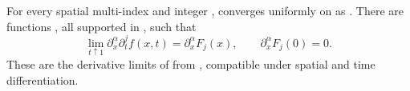 \begin{lemma}\label{lem:10.2}
For every spatial multi-index  and integer
,  converges
uniformly on  as
. There are functions
, all supported in
, such that
\begin{equation}
\lim_{t\uparrow1}\partial_x^\alpha\partial_t^jf(x,t)=\partial_x^\alpha F_j(x),
\qquad \partial_x^\alpha F_j(0)=0.
\tag{10.6}\label{eq:10.6}
\end{equation}
These are the derivative limits of  from
, compatible under spatial and time differentiation.
\end{lemma}
%
